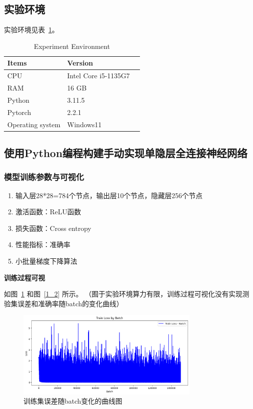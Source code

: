 \documentclass[12pt]{article}
\begin{document}
\subsection{实验环境}
实验环境见表~\ref{tab:indicators}。

\begin{table}[!t]
  \caption{Experiment Environment}
  \label{tab:indicators}
  \centering
  \begin{tabular}{m{5cm}<{\centering}m{5cm}<{\centering}m{4cm}<{\centering}}
    \toprule
    \textbf{Items}   & \textbf{Version}     \\[\medskipamount]
    \midrule
    CPU              & Intel Core i5-1135G7 \\[\medskipamount]
    RAM              & 16 GB                \\[\medskipamount]
    Python           & 3.11.5               \\[\medskipamount]
    Pytorch          & 2.2.1                \\[\medskipamount]
    Operating system & Windows11            \\[\medskipamount]
    \bottomrule
  \end{tabular}
\end{table}


\subsection{使用Python编程构建手动实现单隐层全连接神经网络}
\subsubsection{模型训练参数与可视化}

\begin{enumerate}
  \item 输入层28*28=784个节点，输出层10个节点，隐藏层256个节点
  \item 激活函数：ReLU函数
  \item 损失函数：Cross entropy
  \item 性能指标：准确率
  \item 小批量梯度下降算法
\end{enumerate}

\textbf{训练过程可视}

如图~\ref{1_1} 和图~\ref{1_2} 所示。
（囿于实验环境算力有限，训练过程可视化没有实现测验集误差和准确率随batch的变化曲线）
\begin{figure}[htbp]
  \centering
  \includegraphics[width=0.8\textwidth]{1_1.png}
  \caption[训练集误差随batch变化的曲线图]{训练集误差随batch变化的曲线图}
  \label{1_1}
\end{figure}
\end{document}
